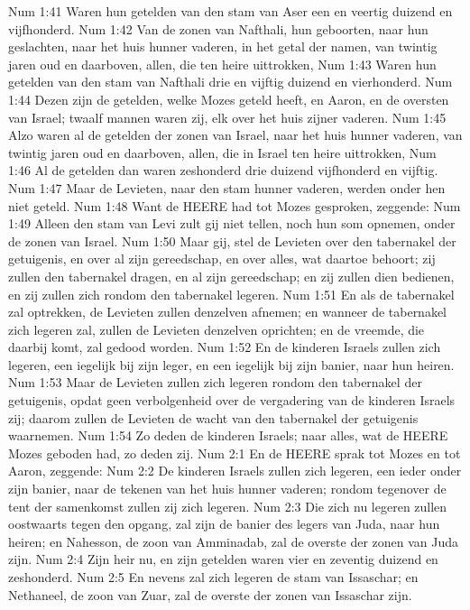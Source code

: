 Num 1:41  Waren hun getelden van den stam van Aser een en veertig duizend en vijfhonderd.
Num 1:42  Van de zonen van Nafthali, hun geboorten, naar hun geslachten, naar het huis hunner vaderen, in het getal der namen, van twintig jaren oud en daarboven, allen, die ten heire uittrokken,
Num 1:43  Waren hun getelden van den stam van Nafthali drie en vijftig duizend en vierhonderd.
Num 1:44  Dezen zijn de getelden, welke Mozes geteld heeft, en Aaron, en de oversten van Israel; twaalf mannen waren zij, elk over het huis zijner vaderen.
Num 1:45  Alzo waren al de getelden der zonen van Israel, naar het huis hunner vaderen, van twintig jaren oud en daarboven, allen, die in Israel ten heire uittrokken,
Num 1:46  Al de getelden dan waren zeshonderd drie duizend vijfhonderd en vijftig.
Num 1:47  Maar de Levieten, naar den stam hunner vaderen, werden onder hen niet geteld.
Num 1:48  Want de HEERE had tot Mozes gesproken, zeggende:
Num 1:49  Alleen den stam van Levi zult gij niet tellen, noch hun som opnemen, onder de zonen van Israel.
Num 1:50  Maar gij, stel de Levieten over den tabernakel der getuigenis, en over al zijn gereedschap, en over alles, wat daartoe behoort; zij zullen den tabernakel dragen, en al zijn gereedschap; en zij zullen dien bedienen, en zij zullen zich rondom den tabernakel legeren.
Num 1:51  En als de tabernakel zal optrekken, de Levieten zullen denzelven afnemen; en wanneer de tabernakel zich legeren zal, zullen de Levieten denzelven oprichten; en de vreemde, die daarbij komt, zal gedood worden.
Num 1:52  En de kinderen Israels zullen zich legeren, een iegelijk bij zijn leger, en een iegelijk bij zijn banier, naar hun heiren.
Num 1:53  Maar de Levieten zullen zich legeren rondom den tabernakel der getuigenis, opdat geen verbolgenheid over de vergadering van de kinderen Israels zij; daarom zullen de Levieten de wacht van den tabernakel der getuigenis waarnemen.
Num 1:54  Zo deden de kinderen Israels; naar alles, wat de HEERE Mozes geboden had, zo deden zij.
Num 2:1  En de HEERE sprak tot Mozes en tot Aaron, zeggende:
Num 2:2  De kinderen Israels zullen zich legeren, een ieder onder zijn banier, naar de tekenen van het huis hunner vaderen; rondom tegenover de tent der samenkomst zullen zij zich legeren.
Num 2:3  Die zich nu legeren zullen oostwaarts tegen den opgang, zal zijn de banier des legers van Juda, naar hun heiren; en Nahesson, de zoon van Amminadab, zal de overste der zonen van Juda zijn.
Num 2:4  Zijn heir nu, en zijn getelden waren vier en zeventig duizend en zeshonderd.
Num 2:5  En nevens zal zich legeren de stam van Issaschar; en Nethaneel, de zoon van Zuar, zal de overste der zonen van Issaschar zijn.
